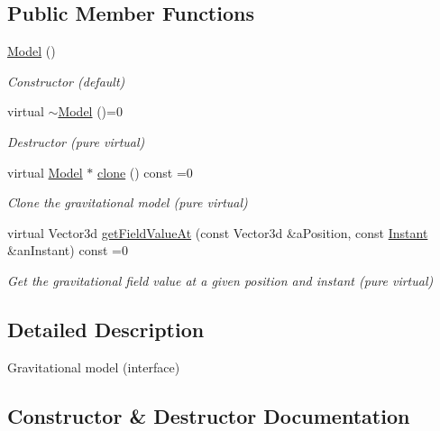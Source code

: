 \subsection*{Public Member Functions}
\begin{DoxyCompactItemize}
\item 
\hyperlink{classlibrary_1_1physics_1_1environment_1_1gravitational_1_1_model_a56f998f2fad008ff373befea1da8c4fa}{Model} ()
\begin{DoxyCompactList}\small\item\em Constructor (default) \end{DoxyCompactList}\item 
virtual \hyperlink{classlibrary_1_1physics_1_1environment_1_1gravitational_1_1_model_a8ad597d26bc0b1a92106120f48c3ff78}{$\sim$\+Model} ()=0
\begin{DoxyCompactList}\small\item\em Destructor (pure virtual) \end{DoxyCompactList}\item 
virtual \hyperlink{classlibrary_1_1physics_1_1environment_1_1gravitational_1_1_model}{Model} $\ast$ \hyperlink{classlibrary_1_1physics_1_1environment_1_1gravitational_1_1_model_a5e75fe26d0635e2d97916ea0e7def842}{clone} () const =0
\begin{DoxyCompactList}\small\item\em Clone the gravitational model (pure virtual) \end{DoxyCompactList}\item 
virtual Vector3d \hyperlink{classlibrary_1_1physics_1_1environment_1_1gravitational_1_1_model_aac2962e4bf0fddb4d80c21038f1b24e2}{get\+Field\+Value\+At} (const Vector3d \&a\+Position, const \hyperlink{classlibrary_1_1physics_1_1time_1_1_instant}{Instant} \&an\+Instant) const =0
\begin{DoxyCompactList}\small\item\em Get the gravitational field value at a given position and instant (pure virtual) \end{DoxyCompactList}\end{DoxyCompactItemize}


\subsection{Detailed Description}
Gravitational model (interface) 

\subsection{Constructor \& Destructor Documentation}
\mbox{\label{classlibrary_1_1physics_1_1environment_1_1gravitational_1_1_model_a56f998f2fad008ff373befea1da8c4fa}} 
